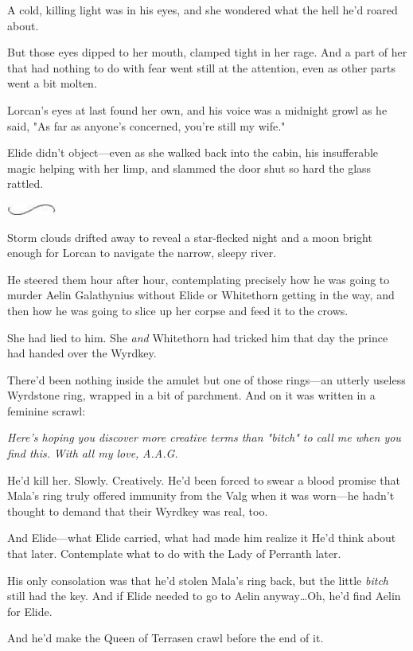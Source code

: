 A cold, killing light was in his eyes, and she wondered what the hell he'd roared about.

But those eyes dipped to her mouth, clamped tight in her rage.
And a part of her that had nothing to do with fear went still at the attention, even as other parts went a bit molten.

Lorcan's eyes at last found her own, and his voice was a midnight growl as he said, "As far as anyone's concerned, you're still my wife."

Elide didn't object---even as she walked back into the cabin, his insufferable magic helping with her limp, and slammed the door shut so hard the glass rattled.

\begin{center}
	\includegraphics[width=0.65in,height=0.13in]{images/seperator}
\end{center}

Storm clouds drifted away to reveal a star-flecked night and a moon bright enough for Lorcan to navigate the narrow, sleepy river.

He steered them hour after hour, contemplating precisely how he was going to murder Aelin Galathynius without Elide or Whitethorn getting in the way, and then how he was going to slice up her corpse and feed it to the crows.

She had lied to him.
She \emph{and} Whitethorn had tricked him that day the prince had handed over the Wyrdkey.

There'd been nothing inside the amulet but one of those rings---an utterly useless Wyrdstone ring, wrapped in a bit of parchment.
And on it was written in a feminine scrawl:

\emph{Here's hoping you discover more creative terms than "bitch" to call me when you find this.} \emph{With all my love,} \emph{A.A.G.}

He'd kill her.
Slowly.
Creatively.
He'd been forced to swear a blood promise that Mala's ring truly offered immunity from the Valg when it was worn---he hadn't thought to demand that their Wyrdkey was real, too.

And Elide---what Elide carried, what had made him realize it 
He'd think about that later.
Contemplate what to do with the Lady of Perranth later.

His only consolation was that he'd stolen Mala's ring back, but the little \emph{bitch} still had the key.
And if Elide needed to go to Aelin anyway\ldots Oh, he'd find Aelin for Elide.

And he'd make the Queen of Terrasen crawl before the end of it.

